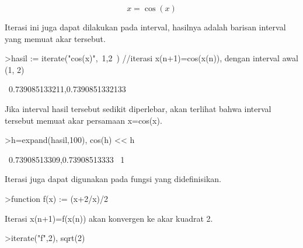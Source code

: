 \documentclass[a4paper,10pt]{article}
\begin{document}
\begin{eulernotebook}
\begin{eulercomment}
\begin{eulercomment}
\begin{eulercomment}
\begin{eulercomment}
\begin{eulercomment}
\begin{eulercomment}
\begin{eulercomment}
\begin{eulercomment}
\begin{eulercomment}
\begin{eulercomment}
\begin{eulercomment}
\begin{eulercomment}
\begin{eulercomment}
\begin{eulercomment}
\begin{eulercomment}
\begin{eulercomment}
\begin{eulercomment}
\begin{eulercomment}
\begin{eulercomment}
\begin{eulercomment}
\begin{eulercomment}
\begin{eulercomment}
\begin{eulercomment}
\begin{eulercomment}
\begin{eulercomment}
\begin{eulercomment}
\begin{eulercomment}
\begin{eulercomment}
\begin{eulercomment}
\begin{eulercomment}
\begin{eulercomment}
\begin{eulercomment}
\begin{eulercomment}
\end{eulercomment}
\begin{eulerformula}
\[
x = \cos(x)
\]
\end{eulerformula}
\begin{eulercomment}
Iterasi ini juga dapat dilakukan pada interval, hasilnya adalah
barisan interval yang memuat akar tersebut.
\end{eulercomment}
\begin{eulerprompt}
>hasil := iterate("cos(x)",~1,2~) //iterasi x(n+1)=cos(x(n)), dengan interval awal (1, 2)
\end{eulerprompt}
\begin{euleroutput}
  ~0.739085133211,0.7390851332133~
\end{euleroutput}
\begin{eulercomment}
Jika interval hasil tersebut sedikit diperlebar, akan terlihat bahwa
interval tersebut memuat akar persamaan x=cos(x).
\end{eulercomment}
\begin{eulerprompt}
>h=expand(hasil,100), cos(h) << h
\end{eulerprompt}
\begin{euleroutput}
  ~0.73908513309,0.73908513333~
  1
\end{euleroutput}
\begin{eulercomment}
Iterasi juga dapat digunakan pada fungsi yang didefinisikan.
\end{eulercomment}
\begin{eulerprompt}
>function f(x) := (x+2/x)/2
\end{eulerprompt}
\begin{eulercomment}
Iterasi x(n+1)=f(x(n)) akan konvergen ke akar kuadrat 2.
\end{eulercomment}
\begin{eulerprompt}
>iterate("f",2), sqrt(2)
\end{eulerprompt}
\begin{euleroutput}

\end{euleroutput}
\end{eulercomment}
\end{eulercomment}
\end{eulercomment}
\end{eulercomment}
\end{eulercomment}
\end{eulercomment}
\end{eulercomment}
\end{eulercomment}
\end{eulercomment}
\end{eulercomment}
\end{eulercomment}
\end{eulercomment}
\end{eulercomment}
\end{eulercomment}
\end{eulercomment}
\end{eulercomment}
\end{eulercomment}
\end{eulercomment}
\end{eulercomment}
\end{eulercomment}
\end{eulercomment}
\end{eulercomment}
\end{eulercomment}
\end{eulercomment}
\end{eulercomment}
\end{eulercomment}
\end{eulercomment}
\end{eulercomment}
\end{eulercomment}
\end{eulercomment}
\end{eulercomment}
\end{eulercomment}
\end{eulernotebook}
\end{document}
